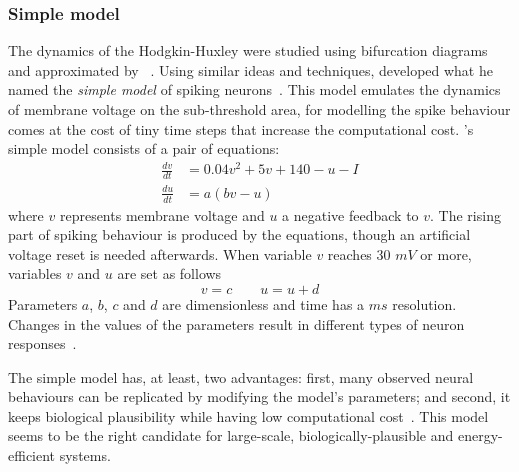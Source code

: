 \subsubsection{Simple model}
The dynamics of the Hodgkin-Huxley were studied using bifurcation diagrams and approximated by \citeauthor{fitzhugh1961impulses}~\cite{fitzhugh1961impulses}. Using similar ideas and techniques, \citeauthor{izhikevich2003simple} developed what he named the \emph{simple model} of spiking neurons~\cite{izhikevich2003simple}. This model emulates the dynamics of membrane voltage on the sub-threshold area, for modelling the spike behaviour comes at the cost of tiny time steps that increase the computational cost. \citeauthor{izhikevich2003simple}'s simple model consists of a pair of equations:
\begin{align}
  \frac{dv}{dt} &= 0.04v^{2} + 5v + 140 - u - I \\[0.5em]
  \frac{du}{dt} &= a(bv - u)
\end{align}
where $v$ represents membrane voltage and $u$ a negative feedback to $v$. The rising part of spiking behaviour is produced by the equations, though an artificial voltage reset is needed afterwards. When variable $v$ reaches 30 $mV$ or more, variables $v$ and $u$ are set as follows
\begin{equation}
  v = c \qquad u = u + d
\end{equation}
Parameters $a$, $b$, $c$ and $d$ are dimensionless and time has a $ms$ resolution. Changes in  the values of the parameters result in different types of neuron responses~\cite{dynamical-systems-Izhikevich2007}. 

The simple model has, at least, two advantages: first, many observed neural behaviours can be replicated by modifying the model's parameters; and second, it keeps biological plausibility while having low computational cost~\cite{izhikevich2004model}. This model seems to be the right candidate for large-scale, biologically-plausible and energy-efficient systems.













